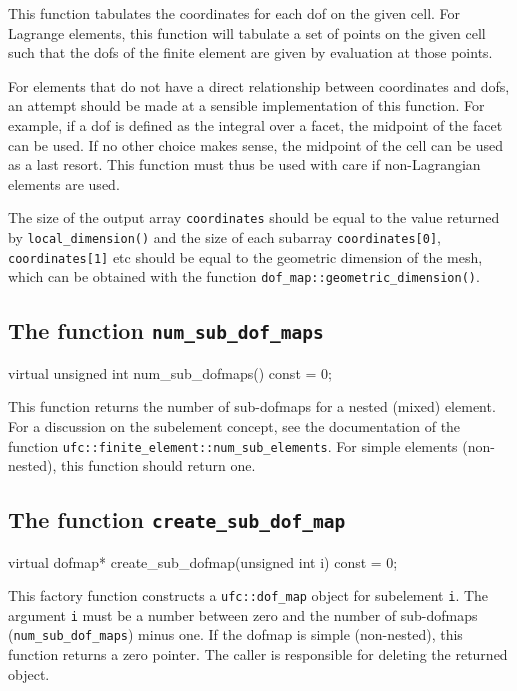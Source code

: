 This function tabulates the coordinates for each dof on the given
cell. For Lagrange elements, this function will tabulate a set of
points on the given cell such that the dofs of the finite element are
given by evaluation at those points.

For elements that do not have a direct relationship between
coordinates and dofs, an attempt should be made at a sensible
implementation of this function. For example, if a dof is defined as
the integral over a facet, the midpoint of the facet can be used. If
no other choice makes sense, the midpoint of the cell can be used as a
last resort. This function must thus be used with care if
non-Lagrangian elements are used.

The size of the output array \texttt{coordinates} should be equal to
the value returned by \texttt{local\_dimension()} and the size of each
subarray \texttt{coordi\-nates[0]}, \texttt{coordinates[1]} etc should
be equal to the geometric dimension of the mesh, which can be obtained
with the function \texttt{dof\_map::geometric\_\-dimension()}.

\subsection{The function \texttt{num\_sub\_dof\_maps}}

\begin{code}
virtual unsigned int num_sub_dofmaps() const = 0;
\end{code}

This function returns the number of sub-dofmaps for a nested (mixed)
element. For a discussion on the subelement concept, see the
documentation of the function
\texttt{ufc::finite\_element::num\_sub\_elements}. For simple
elements (non-nested), this function should return one.

\subsection{The function \texttt{create\_sub\_dof\_map}}

\begin{code}
virtual dofmap* create_sub_dofmap(unsigned int i) const = 0;
\end{code}

This factory function constructs a \texttt{ufc::dof\_map} object for
subelement \texttt{i}. The argument \texttt{i} must be a number
between zero and the number of sub-dofmaps
(\texttt{num\_sub\_dof\_maps}) minus one. If the dofmap is simple
(non-nested), this function returns a zero pointer. The caller is
responsible for deleting the returned object.

